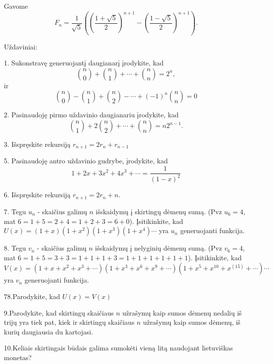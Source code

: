 Gavome $$F_n = \frac{1}{\sqrt{5}}(\left(\frac{1+\sqrt{5}}{2}\right)^{n+1}- \left(\frac{1-\sqrt{5}}{2}\right)^{n+1}).$$

\bigskip
Uždaviniai: 


\bigskip

  1. \hspace{0.15cm} Sukonstravę generuojantį daugianarį įrodykite, kad $$\binom{n}{0} + \binom{n}{1} + \cdots + \binom{n}{n} = 2^n,$$ ir $$\binom{n}{0} - \binom{n}{1} + \binom{n}{2} - \cdots  + (-1)^n \binom{n}{n} = 0 $$\smallskip
  
  2. \hspace{0.15cm} Pasinaudoję pirmo uždavinio daugianariu įrodykite, kad $$\binom{n}{1} + 2\binom{n}{2} + \cdots + \binom{n}{n} = n2^{n-1}.$$\smallskip
  
  3. \hspace{0.15cm} Išspręskite rekursiją $r_{n+1} = 2r_n + r_{n-1}$\smallskip
  
  5. \hspace{0.15cm}Pasinaudoję antro uždavinio gudrybe, įrodykite, kad $$1 + 2x + 3x^2 + 4x^3 + \cdots = \frac{1}{(1-x)^2}$$\smallskip

	6. \hspace{0.15cm}Išspręskite rekursiją $r_{n+1} = 2r_n + n.$\smallskip
	
	7. \hspace{0.15cm}Tegu $u_n$ - skaičius galimų $n$ išskaidymų į skirtingų dėmenų sumą. (Pvz $u_6 = 4$, mat $6=1+5=2+4=1+2+3=6+0$).
	Įsitikinkite, kad $U(x)=(1+x)(1+x^2)(1+x^3)(1+x^4)\cdots$ yra $u_n$ generuojanti funkcija. \smallskip
	
	8. \hspace{0.15cm}Tegu $v_n$ - skaičius galimų $n$ išskaidymų į nelyginių dėmenų sumą. (Pvz $v_6 = 4$, mat $6=1+5=3+3=1+1+1+3=1+1+1+1+1+1$).
	Įsitikinkite, kad $V(x)=(1+x+x^2+x^3+\cdots)(1+x^3+x^6+x^9+\cdots)(1+x^5+x^{10}+x^(15)+\cdots)\cdots$ yra $v_n$ generuojanti funkcija.\smallskip
	
	78.\hspace{0.15cm}Parodykite, kad $U(x) = V(x)$\smallskip
  
  9.\hspace{0.15cm}Parodykite, kad skirtingų skaičiaus $n$ užrašymų kaip sumos dėmenų nedalių iš trijų yra tiek pat, kiek ir skirtingų skaičiaus $n$ užrašymų kaip sumos dėmenų, iš kurių daugiausia du kartojasi. \smallskip
  
  10.\hspace{0.15cm}Keliais skirtingais būdais galima sumokėti vieną litą naudojant lietuviškas monetas?\smallskip
  
